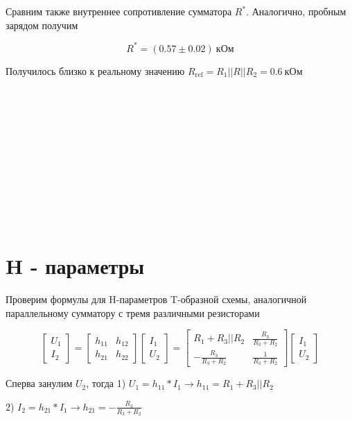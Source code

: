 \documentclass[a4paper]{article}
\begin{document}
Сравним также внутреннее сопротивление сумматора $R^*$. Аналогично, пробным зарядом получим

\begin{equation}
    R^* = (0.57 \pm 0.02) \ \text{кОм}
\end{equation}

Получилось близко к реальному значению \newline $R_\text{ref} = R_1 || R || R_2 = 0.6 \ \text{кОм}$

\\\

\\\

\\\

\\\

\section{H - параметры}

Проверим формулы для H-параметров T-образной схемы,
аналогичной параллельному сумматору с тремя различными резисторами

\[
\begin{bmatrix}
    U_1\\
    I_2
\end{bmatrix}
 =
\begin{bmatrix}
    h_{11} & h_{12}\\
    h_{21} & h_{22}
\end{bmatrix}
\begin{bmatrix}
    I_1\\
    U_2
\end{bmatrix}
 =
\begin{bmatrix}
    R_1 + R_3||R_2         & \frac{R_3}{R_3 + R_2} \\
    -\frac{R_3}{R_3 + R_2} & \frac{1}{R_3 + R_2}
\end{bmatrix}
\begin{bmatrix}
    I_1\\
    U_2
\end{bmatrix}
\]

Сперва занулим $U_2$, тогда 1) $U_1 = h_{11} * I_1 \longrightarrow h_{11} = R_1 + R_3 || R_2$

\hspace{4.2cm} 2) $I_2 = h_{21} * I_1 \longrightarrow h_{21} = -\frac{R_3}{R_3 + R_2}$

\vspace{0.3cm}
\end{document}
